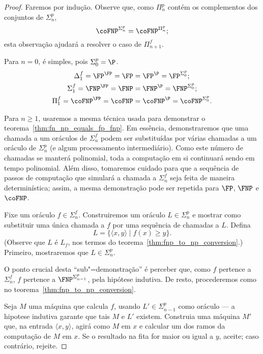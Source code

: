 \begin{proof}
    Faremos por indução.
    Observe que,
    como $\Pi_n^p$ contém os complementos dos conjuntos de $\Sigma_n^p$,
    \begin{equation*}
        \coFNP^{\Sigma_n^p} = \coFNP^{\Pi_n^p};
    \end{equation*}
    esta observação ajudará a resolver o caso de $\Pi_{n+1}^f$.

    Para $n = 0$, é simples, pois $\Sigma_0^p = \P$.
    \begin{align*}
        \Delta_1^f = \FP^\FP = \FP &= \FP^\P = \FP^{\Sigma_0^p}; \\
        \Sigma_1^f = \FNP^\FP = \FNP &= \FNP^\P = \FNP^{\Sigma_0^p}; \\
        \Pi_1^f = \coFNP^\FP = \coFNP &= \coFNP^\P = \coFNP^{\Sigma_0^p}.
    \end{align*}

    Para $n \geq 1$, usaremos a mesma técnica usada
    para demonstrar o teorema~\ref{thm:fn_np_equals_fp_fnp}.
    Em essência,
    demonstraremos que uma chamada a um oráculos de $\Sigma_n^f$
    podem ser substituídas por várias chamadas a um oráculo de $\Sigma_n^p$
    (e algum processamento intermediário).
    Como este número de chamadas se manterá polinomial,
    toda a computação em si continuará sendo em tempo polinomial.
    Além disso,
    tomaremos cuidado para que a sequência de passos de computação
    que simulará a chamada a $\Sigma_n^f$
    seja feita de maneira determinística;
    assim,
    a mesma demonstração pode ser repetida para $\FP$, $\FNP$ e $\coFNP$.

    Fixe um oráculo $f \in \Sigma_n^f$.
    Construiremos um oráculo $L \in \Sigma_n^p$
    e mostrar como substituir uma única chamada a $f$
    por uma sequência de chamadas a $L$.
    Defina
    \begin{equation*}
        L = \{\langle x, y\rangle \mid f(x) \geq y\}.
    \end{equation*}
    (Observe que $L$ é $L_f$, nos termos do teorema~\ref{thm:fnp_to_np_conversion}.)
    Primeiro, mostraremos que $L \in \Sigma_n^p$.

    O ponto crucial desta ``sub"=demonstração'' é perceber que,
    como $f$ pertence a $\Sigma_n^f$,
    $f$ pertence a $\FNP^{\Sigma_{n-1}^p}$,
    pela hipótese indutiva.
    De resto, procederemos como no teorema~\ref{thm:fnp_to_np_conversion}.

    Seja $M$ uma máquina que calcula $f$,
    usando $L' \in \Sigma_{n-1}^p$ como oráculo
    --- a hipotese indutiva garante que tais $M$ e $L'$ existem.
    Construia uma máquina $M'$ que,
    na entrada $\langle x, y \rangle$,
    agirá como $M$ em $x$ e calcular um dos ramos da computação de $M$ em $x$.
    Se o resultado na fita for maior ou igual a $y$,
    aceite;
    caso contrário, rejeite.


\end{proof}
